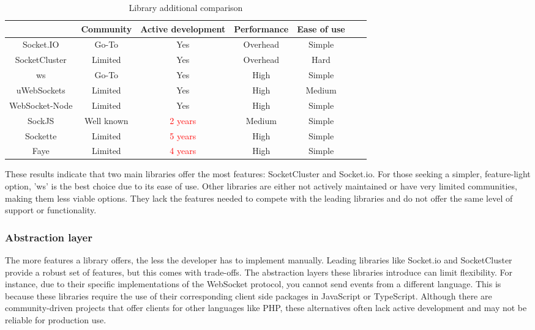 \begin{table}[h]
  \centering
  \begin{tabular}{|c|c|c|c|c|c|c|}
    \hline
                   & Community  & Active development       & Performance & Ease of use \\ \hline
    Socket.IO      & Go-To      & Yes                      & Overhead    & Simple      \\ \hline
    SocketCluster  & Limited    & Yes                      & Overhead    & Hard        \\ \hline
    ws             & Go-To      & Yes                      & High        & Simple      \\ \hline
    uWebSockets    & Limited    & Yes                      & High        & Medium      \\ \hline
    WebSocket-Node & Limited    & Yes                      & High        & Simple      \\ \hline
    SockJS         & Well known & \textcolor{red}{2 years} & Medium      & Simple      \\ \hline
    Sockette       & Limited    & \textcolor{red}{5 years} & High        & Simple      \\ \hline
    Faye           & Limited    & \textcolor{red}{4 years} & High        & Simple      \\ \hline
  \end{tabular}
  \caption{Library additional comparison}
\end{table}

These results indicate that two main libraries offer the most features: SocketCluster and Socket.io. For those seeking a simpler, feature-light option, 'ws' is the best choice due to its ease of use. Other libraries are either not actively maintained or have very limited communities, making them less viable options. They lack the features needed to compete with the leading libraries and do not offer the same level of support or functionality. \cite{alby-ws-libs} \cite{logrocket-ws-libs} \cite{atatus-ws-libs}

\subsubsection{Abstraction layer}

The more features a library offers, the less the developer has to implement manually. Leading libraries like Socket.io and SocketCluster provide a robust set of features, but this comes with trade-offs. The abstraction layers these libraries introduce can limit flexibility. For instance, due to their specific implementations of the WebSocket protocol, you cannot send events from a different language. This is because these libraries require the use of their corresponding client side packages in JavaScript or TypeScript. Although there are community-driven projects that offer clients for other languages like PHP, these alternatives often lack active development and may not be reliable for production use.

